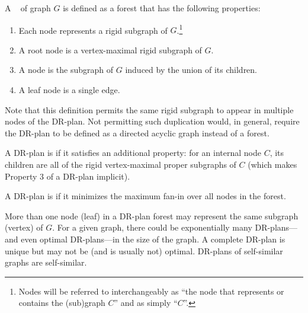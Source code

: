 \begin{definition}
[DR-plan]
\label{def:drp}
    A ~\cite{hoffman2001decompositionI} of graph $G$ is defined as a forest that has the following properties:
    \begin{enumerate}
        \item Each node represents a rigid subgraph of $G$.\footnote{Nodes will be referred to interchangeably as ``the node that represents or contains the (sub)graph $C$'' and as simply ``$C$''.}
        \item A root node is a vertex-maximal rigid subgraph of $G$.
        \item A node is the subgraph of $G$ induced by the union of its children.
        \item A leaf node is a single edge.
    \end{enumerate}
\end{definition}

Note that this definition permits the same rigid subgraph to appear in multiple nodes of the DR-plan. Not permitting such duplication would, in general, require the DR-plan to be defined as a directed acyclic graph instead of a forest.

\begin{definition}
    A DR-plan is  if it satisfies an additional property: for an internal node $C$, its children are all of the rigid vertex-maximal proper subgraphs of $C$ (which makes Property 3 of a DR-plan implicit).
\end{definition}

\begin{definition}
    A DR-plan is  if it minimizes the maximum fan-in over all nodes in the forest.
\end{definition}






%
\begin{remark}
  More than one node (leaf) in a DR-plan forest may represent the same subgraph (vertex) of $G$.
  For a given graph, there could be exponentially many DR-plans---and even optimal DR-plans---in the size of the graph. A complete DR-plan is unique but may not be (and is usually not) optimal. DR-plans of self-similar graphs are self-similar.
\end{remark}

